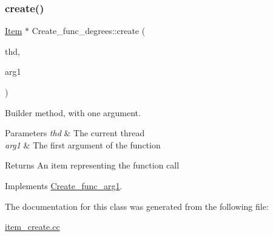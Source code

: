 \subsubsection{\texorpdfstring{create()}{create()}}
{\footnotesize\ttfamily \mbox{\hyperlink{classItem}{Item}} $\ast$ Create\+\_\+func\+\_\+degrees\+::create (\begin{DoxyParamCaption}\item[{T\+HD $\ast$}]{thd,  }\item[{\mbox{\hyperlink{classItem}{Item}} $\ast$}]{arg1 }\end{DoxyParamCaption})\hspace{0.3cm}{\ttfamily [virtual]}}

Builder method, with one argument. 
\begin{DoxyParams}{Parameters}
{\em thd} & The current thread \\
\hline
{\em arg1} & The first argument of the function \\
\hline
\end{DoxyParams}
\begin{DoxyReturn}{Returns}
An item representing the function call 
\end{DoxyReturn}


Implements \mbox{\hyperlink{classCreate__func__arg1_a3e9a98f755cd82c3e762e334c955a8c9}{Create\+\_\+func\+\_\+arg1}}.



The documentation for this class was generated from the following file\+:\begin{DoxyCompactItemize}
\item 
\mbox{\hyperlink{item__create_8cc}{item\+\_\+create.\+cc}}\end{DoxyCompactItemize}
